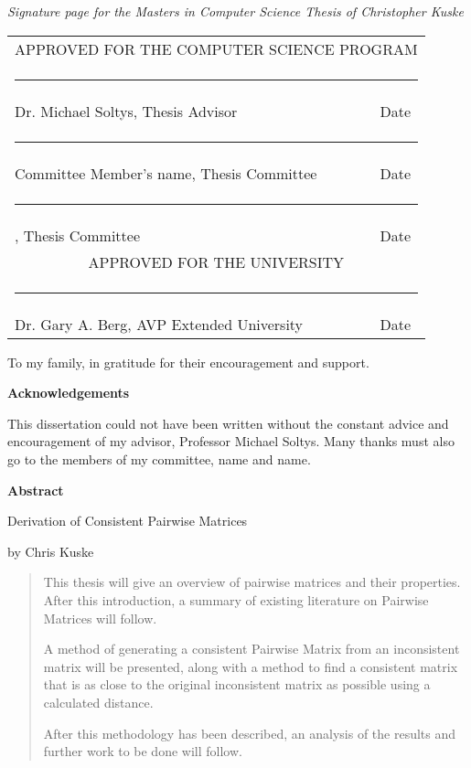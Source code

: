 \documentclass[12pt]{amsart}
\newcommand{\chairfaculty}{Dr. Michael Soltys}
\newcommand{\firstfaculty}{Committee Member's name}
\newcommand{\univefaculty}{Dr. Gary A. Berg}
\def\thesistitle{Derivation of Consistent Pairwise Matrices}
\def\name{Chris Kuske}
\newif \ifshort
\newcommand{\committee}[1]{\ifshort {\committeeshort} \else {\committeelong} \fi}
\newcommand{\committeeshort}{\vspace*{2.13in} \begin{tabular}{ll}
   \multicolumn{2}{c}{\hspace*{2.9cm} APPROVED FOR THE COMPUTER SCIENCE PROGRAM}\\[10mm]
   \multicolumn{2}{c}{\hspace*{1.65cm}\rule{4.5in}{.01in}}\\[-4mm]
   \hspace*{3cm}\chairfaculty, Thesis Advisor \hspace*{0cm}&  Date\\[4mm]
   \multicolumn{2}{c}{\hspace*{1.65cm}\rule{4.5in}{.01in}}\\[-4mm]
   \hspace*{3cm}\firstfaculty, Thesis Committee \hspace*{0cm}&  Date\\[17mm]
   \multicolumn{2}{c}{\hspace*{6.15cm} APPROVED FOR THE UNIVERSITY}\\[6mm]
   \multicolumn{2}{c}{\hspace*{1.9cm}\rule{4.5in}{.01in}}\\[-4mm]
   \hspace*{3cm}\univefaculty, AVP Extended University \hspace*{0cm}&  Date\\
 \end{tabular}}
\newcommand{\committeelong}{\vspace*{1.25in} \begin{tabular}{ll}
   \multicolumn{2}{c}{\hspace*{2.9cm} APPROVED FOR THE COMPUTER SCIENCE PROGRAM}\\[10mm]
   \multicolumn{2}{c}{\hspace*{1.65cm}\rule{4.5in}{.01in}}\\[-4mm]
   \hspace*{3cm}\chairfaculty, Thesis Advisor \hspace*{0cm}&  Date\\[4mm]
   \multicolumn{2}{c}{\hspace*{1.65cm}\rule{4.5in}{.01in}}\\[-4mm]
   \hspace*{3cm}\firstfaculty, Thesis Committee \hspace*{0cm}&  Date\\[17mm]
   \multicolumn{2}{c}{\hspace*{1.65cm}\rule{4.5in}{.01in}}\\[-4mm]
   \hspace*{3cm}\seconfaculty, Thesis Committee  &  Date\\[20mm]
   \multicolumn{2}{c}{\hspace*{6.15cm} APPROVED FOR THE UNIVERSITY}\\[6mm]
   \multicolumn{2}{c}{\hspace*{1.9cm}\rule{4.5in}{.01in}}\\[-4mm]
   \hspace*{3cm}\univefaculty, AVP Extended University \hspace*{0cm}&  Date\\
 \end{tabular}}
\theoremstyle{definition}
\begin{document}
\newpage
 \setlength{\paperheight}{13in}
 \setlength{\topmargin}{1.25cm}

{\center\emph{Signature page for the Masters in Computer Science Thesis of Christopher Kuske }}

\committee


 \newpage
 \setlength{\topmargin}{-0.4375in}
 \setlength{\paperheight}{11.5in}

\begin{center}
\vspace*{60mm}

To my family, in gratitude for their encouragement and support.

\end{center}


\newpage

\begin{center}
\vspace*{50mm}
{\bf Acknowledgements}
\end{center}

This dissertation could not have been written without the constant advice and encouragement of my advisor, Professor Michael Soltys.
Many thanks must also go to the members of my committee, name and name. 

\newpage
\pagestyle{plain}
 

{\bf Abstract}

\bigskip

\thesistitle

by
\name \bigskip
\begin{quote}

This thesis will give an overview of pairwise matrices and their properties. After this introduction, a summary of existing literature on Pairwise Matrices will follow.  

A method of generating a consistent Pairwise Matrix from an inconsistent matrix will be presented, along with a method to find a consistent matrix that is as close to the original inconsistent matrix as possible using a calculated distance.

After this methodology has been described, an analysis of the results and further work to be done will follow.
\end{quote} 
\end{document}
